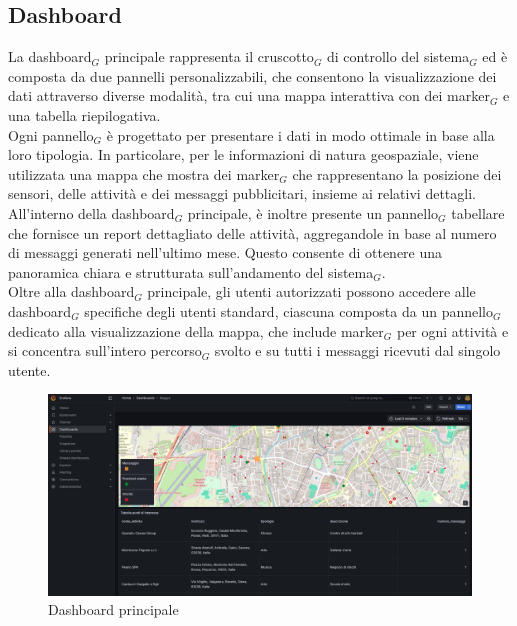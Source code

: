 \documentclass[10pt]{article}
\begin{document}
\begin{justify}
\subsection{Dashboard}
La dashboard$_G$ principale rappresenta il cruscotto$_G$ di controllo del sistema$_G$ ed è composta da due pannelli personalizzabili, che consentono la visualizzazione dei dati attraverso diverse modalità, tra cui una mappa interattiva con dei marker$_G$ e una tabella riepilogativa.\\
Ogni pannello$_G$ è progettato per presentare i dati in modo ottimale in base alla loro tipologia. In particolare, per le informazioni di natura geospaziale, viene utilizzata una mappa che mostra dei marker$_G$ che rappresentano la posizione dei sensori, delle attività e dei messaggi pubblicitari, insieme ai relativi dettagli. All'interno della dashboard$_G$ principale, è inoltre presente un pannello$_G$ tabellare che fornisce un report dettagliato delle attività, aggregandole in base al numero di messaggi generati nell'ultimo mese. Questo consente di ottenere una panoramica chiara e strutturata sull'andamento del sistema$_G$.\\
Oltre alla dashboard$_G$ principale, gli utenti autorizzati possono accedere alle dashboard$_G$ specifiche degli utenti standard, ciascuna composta da un pannello$_G$ dedicato alla visualizzazione della mappa, che include marker$_G$ per ogni attività e si concentra sull'intero percorso$_G$ svolto e su tutti i messaggi ricevuti dal singolo utente.\\
\begin{figure}[H]
    \centering
    \includegraphics[width=1\linewidth]{dashboard.png}
    \caption{Dashboard principale}
\end{figure}


\end{justify}
\end{document}
